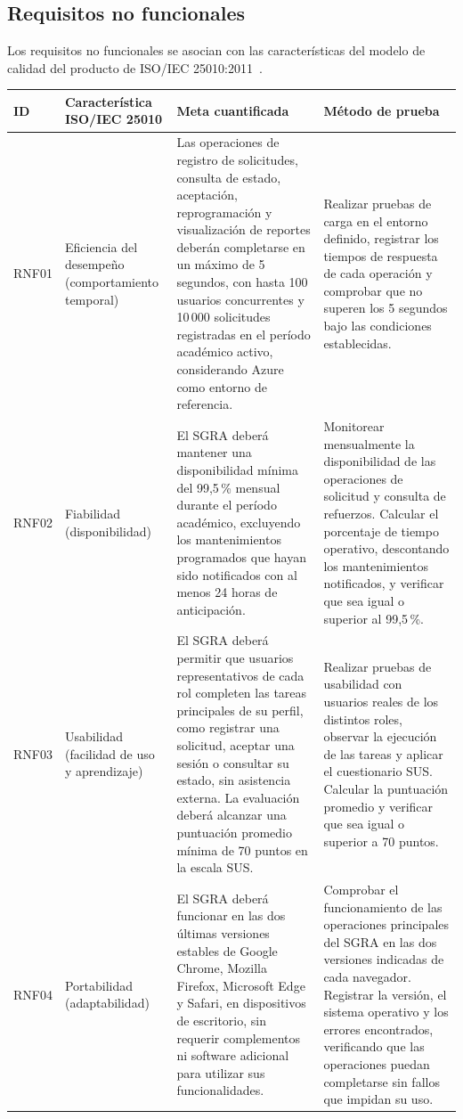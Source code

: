 \subsection{Requisitos no funcionales}
Los requisitos no funcionales se asocian con las características del modelo de calidad del producto de ISO/IEC 25010:2011~\cite{iso25010-2011}.

\begin{longtable}{@{}p{}p{}p{}p{}@{}}
\toprule\textbf{ID}&\textbf{Característica ISO/IEC 25010}&\textbf{Meta cuantificada}&\textbf{Método de prueba}\\\midrule\endhead
RNF01 &
Eficiencia del desempeño (comportamiento temporal) &
Las operaciones de registro de solicitudes, consulta de estado, aceptación, reprogramación y visualización de reportes deberán completarse en un máximo de 5 segundos, con hasta 100 usuarios concurrentes y 10\,000 solicitudes registradas en el período académico activo, considerando Azure como entorno de referencia. &
Realizar pruebas de carga en el entorno definido, registrar los tiempos de respuesta de cada operación y comprobar que no superen los 5 segundos bajo las condiciones establecidas. \\

RNF02 &
Fiabilidad (disponibilidad) &
El SGRA deberá mantener una disponibilidad mínima del 99,5\,\% mensual durante el período académico, excluyendo los mantenimientos programados que hayan sido notificados con al menos 24 horas de anticipación. &
Monitorear mensualmente la disponibilidad de las operaciones de solicitud y consulta de refuerzos. Calcular el porcentaje de tiempo operativo, descontando los mantenimientos notificados, y verificar que sea igual o superior al 99,5\,\%. \\

RNF03 &
Usabilidad (facilidad de uso y aprendizaje) &
El SGRA deberá permitir que usuarios representativos de cada rol completen las tareas principales de su perfil, como registrar una solicitud, aceptar una sesión o consultar su estado, sin asistencia externa. La evaluación deberá alcanzar una puntuación promedio mínima de 70 puntos en la escala SUS. &
Realizar pruebas de usabilidad con usuarios reales de los distintos roles, observar la ejecución de las tareas y aplicar el cuestionario SUS. Calcular la puntuación promedio y verificar que sea igual o superior a 70 puntos. \\

RNF04 &
Portabilidad (adaptabilidad) &
El SGRA deberá funcionar en las dos últimas versiones estables de Google Chrome, Mozilla Firefox, Microsoft Edge y Safari, en dispositivos de escritorio, sin requerir complementos ni software adicional para utilizar sus funcionalidades. &
Comprobar el funcionamiento de las operaciones principales del SGRA en las dos versiones indicadas de cada navegador. Registrar la versión, el sistema operativo y los errores encontrados, verificando que las operaciones puedan completarse sin fallos que impidan su uso. \\


\end{longtable}
